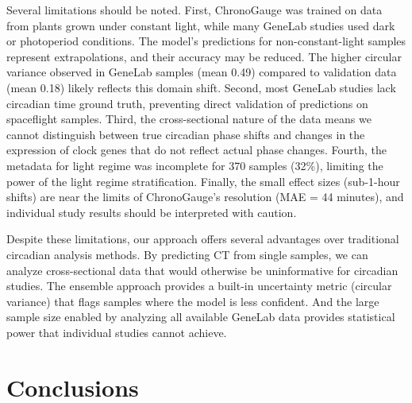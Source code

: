 \documentclass[11pt,a4paper]{article}
\begin{document}
Several limitations should be noted. First, ChronoGauge was trained on data from plants grown under constant light, while many GeneLab studies used dark or photoperiod conditions. The model's predictions for non-constant-light samples represent extrapolations, and their accuracy may be reduced. The higher circular variance observed in GeneLab samples (mean 0.49) compared to validation data (mean 0.18) likely reflects this domain shift. Second, most GeneLab studies lack circadian time ground truth, preventing direct validation of predictions on spaceflight samples. Third, the cross-sectional nature of the data means we cannot distinguish between true circadian phase shifts and changes in the expression of clock genes that do not reflect actual phase changes. Fourth, the metadata for light regime was incomplete for 370 samples (32\%), limiting the power of the light regime stratification. Finally, the small effect sizes (sub-1-hour shifts) are near the limits of ChronoGauge's resolution (MAE = 44 minutes), and individual study results should be interpreted with caution.

Despite these limitations, our approach offers several advantages over traditional circadian analysis methods. By predicting CT from single samples, we can analyze cross-sectional data that would otherwise be uninformative for circadian studies. The ensemble approach provides a built-in uncertainty metric (circular variance) that flags samples where the model is less confident. And the large sample size enabled by analyzing all available GeneLab data provides statistical power that individual studies cannot achieve.

\section*{Conclusions}
\end{document}
